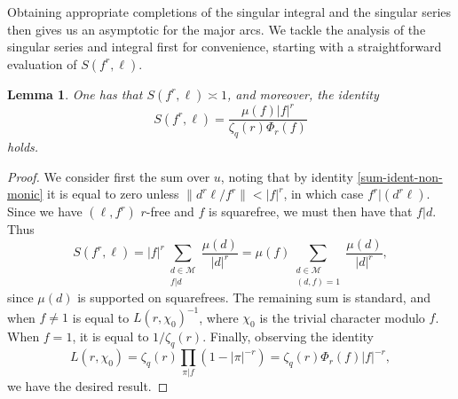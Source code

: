 \documentclass[reqno,11pt]{amsart}
\newtheorem{lemma}[theorem]{Lemma}
\theoremstyle{definition}
\theoremstyle{remark}
\numberwithin{equation}{section}
\def\calM{{\mathcal M}}
\newcommand{\<}{\begin{equation}}
\renewcommand{\>}{\end{equation}}
\begin{document}
Obtaining appropriate completions of the singular integral and the singular series then gives us an asymptotic for the major arcs. We tackle the analysis of the singular series and integral first for convenience, starting with a straightforward evaluation of $S(f^r,\ell)$.
\begin{lemma}\label{S-ident}
    One has that $S(f^r,\ell) \asymp 1$, and moreover, the identity
    \[S(f^r,\ell) = \dfrac{\mu(f)|f|^r}{\zeta_q(r)\Phi_r(f)}\]
    holds.
\end{lemma}
\begin{proof}
    We consider first the sum over $u$, noting that by identity \eqref{sum-ident-non-monic} it is equal to zero unless $\|d^r\ell/f^r\|<|f|^r$, in which case $f^r|(d^r\ell)$. Since we have $(\ell,f^r)$ $r$-free and $f$ is squarefree, we must then have that $f|d$. Thus
    \[S(f^r,\ell) = |f|^r\sum_{\substack{d \in \calM \\ f|d}} \dfrac{\mu(d)}{|d|^r} = \mu(f)\sum_{\substack{d \in \calM \\ (d,f) = 1}} \dfrac{\mu(d)}{|d|^r},\]
    since $\mu(d)$ is supported on squarefrees. The remaining sum is standard, and when $f\neq 1$ is equal to $L(r,\chi_0)^{-1}$, where $\chi_0$ is the trivial character modulo $f$. When $f = 1$, it is equal to $1/\zeta_q(r)$. Finally, observing the identity
    \[L(r,\chi_0) = \zeta_q(r)\prod_{\pi|f} (1-|\pi|^{-r}) = \zeta_q(r)\Phi_r(f)|f|^{-r},\]
    we have the desired result.
\end{proof}
\end{document}

